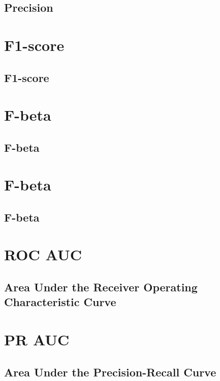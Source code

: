 \subsection{Precision}

\clearpage
\thispagestyle{classificationstyle}
\section{F1-score}
\subsection{F1-score}

\clearpage
\thispagestyle{classificationstyle}
\section{F-beta}
\subsection{F-beta}

\clearpage
\thispagestyle{classificationstyle}
\section{F-beta}
\subsection{F-beta}

\clearpage
\thispagestyle{classificationstyle}
\section{ROC AUC}
\subsection{Area Under the Receiver Operating Characteristic Curve}

\clearpage
\thispagestyle{classificationstyle}
\section{PR AUC}
\subsection{Area Under the Precision-Recall Curve}

